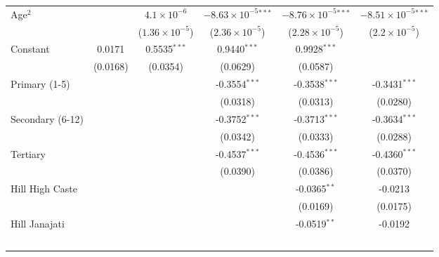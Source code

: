 \begin{tabular}{lccccc}
   Age$^2$                           &                 & $4.1\times 10^{-6}$     & $-8.63\times 10^{-5}$$^{***}$  & $-8.76\times 10^{-5}$$^{***}$  & $-8.51\times 10^{-5}$$^{***}$\\    
                                     &                 & ($1.36\times 10^{-5}$)  & ($2.36\times 10^{-5}$)         & ($2.28\times 10^{-5}$)         & ($2.2\times 10^{-5}$)\\    
   Constant                          & 0.0171          & 0.5535$^{***}$          & 0.9440$^{***}$                 & 0.9928$^{***}$                 &   \\   
                                     & (0.0168)        & (0.0354)                & (0.0629)                       & (0.0587)                       &   \\   
   Primary (1-5)                     &                 &                         & -0.3554$^{***}$                & -0.3538$^{***}$                & -0.3431$^{***}$\\   
                                     &                 &                         & (0.0318)                       & (0.0313)                       & (0.0280)\\   
   Secondary (6-12)                  &                 &                         & -0.3752$^{***}$                & -0.3713$^{***}$                & -0.3634$^{***}$\\   
                                     &                 &                         & (0.0342)                       & (0.0333)                       & (0.0288)\\   
   Tertiary                          &                 &                         & -0.4537$^{***}$                & -0.4536$^{***}$                & -0.4360$^{***}$\\   
                                     &                 &                         & (0.0390)                       & (0.0386)                       & (0.0370)\\   
   Hill High Caste                   &                 &                         &                                & -0.0365$^{**}$                 & -0.0213\\   
                                     &                 &                         &                                & (0.0169)                       & (0.0175)\\   
   Hill Janajati                     &                 &                         &                                & -0.0519$^{**}$                 & -0.0192\\   
$$
\end{tabular}
